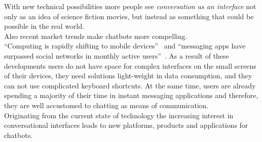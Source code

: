 With new technical possibilities more people see \emph{conversation as an interface} not only as an idea of science fiction movies,
but instead as something that could be possible in the real world.
\\

Also recent market trends make chatbots more compelling.
\\
``Computing is rapidly shifting to mobile devices''~\cite{mobileusage} and ``messaging apps have surpassed social networks in monthly active users''~\cite{convtrends}.
As a result of these developments users do not have space for complex interfaces on the small screens of their devices,
they need solutions light-weight in data consumption, and they can not use complicated keyboard shortcuts.
At the same time, users are already spending a majority of their time in instant messaging applications
and therefore, they are well accustomed to chatting as means of communication.
\\

Originating from the current state of technology the increasing interest in conversational interfaces leads to new platforms, products and applications for chatbots.
